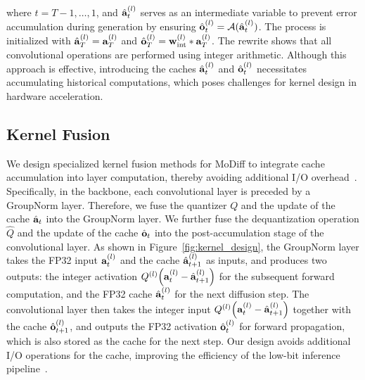 where $t = T-1, \ldots, 1$, and $\hat{{\mathbf{a}}}_{t}^{{(l)}}$ serves as an intermediate variable to prevent error accumulation during generation by ensuring $\hat{{\mathbf{o}}}_{t}^{{(l)}}={\mathcal{A}}(\hat{{\mathbf{a}}}_{t}^{{(l)}})$. The process is initialized with $\hat{{\mathbf{a}}}_{T}^{(l)}= {\mathbf{a}}_{T}^{(l)}$ and $\hat{{\mathbf{o}}}_{T}^{(l)}= {\mathbf{w}}^{(l)}_{\mathrm{int}}*{\mathbf{a}}_{T}^{(l)}$. The rewrite shows that all convolutional operations are performed using integer arithmetic. Although this approach is effective, introducing the caches $\hat{{\mathbf{a}}}_{t}^{{(l)}}$ and $\hat{{\mathbf{o}}}_{t}^{{(l)}}$ necessitates accumulating historical computations, which poses challenges for kernel design in hardware acceleration.


% 

\subsection{Kernel Fusion}

We design specialized kernel fusion methods for MoDiff to integrate cache accumulation into layer computation, thereby avoiding additional I/O overhead~\cite{cutlass,chen2018tvm,vasilache2018tensor}. Specifically, in the backbone, each convolutional layer is preceded by a GroupNorm layer. Therefore, we fuse the quantizer $Q$ and the update of the cache $\hat{{\mathbf{a}}}_t$ into the GroupNorm layer. We further fuse the dequantization operation $\hat Q$ and the update of the cache $\hat{{\mathbf{o}}}_t$ into the post-accumulation stage of the convolutional layer. As shown in Figure~\ref{fig:kernel_design}, the GroupNorm layer takes the FP32 input ${\mathbf{a}}_t^{(l)}$ and the cache $\hat{{\mathbf{a}}}_{t+1}^{(l)}$ as inputs, and produces two outputs: the integer activation $Q^{(l)}\!\left({\mathbf{a}}_t^{(l)}-\hat{{\mathbf{a}}}_{t+1}^{(l)}\right)$ for the subsequent forward computation, and the FP32 cache $\hat{{\mathbf{a}}}_t^{(l)}$ for the next diffusion step. The convolutional layer then takes the integer input $Q^{(l)}\!\left({\mathbf{a}}_t^{(l)}-\hat{{\mathbf{a}}}_{t+1}^{(l)}\right)$ together with the cache $\hat{{\mathbf{o}}}_{t+1}^{(l)}$, and outputs the FP32 activation $\hat{{\mathbf{o}}}_t^{(l)}$ for forward propagation, which is also stored as the cache for the next step. Our design avoids additional I/O operations for the cache, improving the efficiency of the low-bit inference pipeline~\cite{chen2018tvm}.



